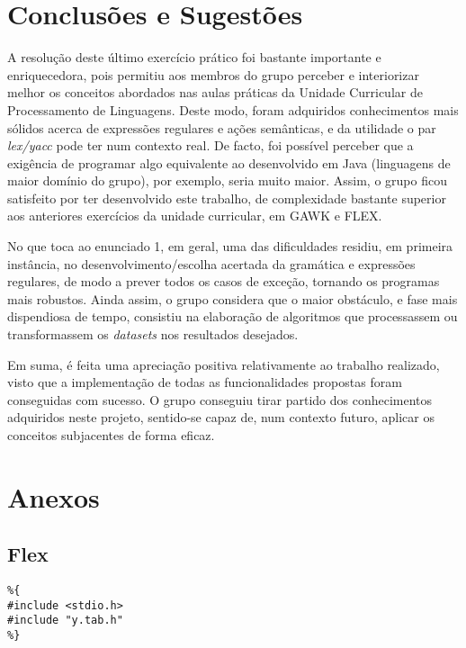 \documentclass[a4paper]{article}
\begin{document}
\section{Conclusões e Sugestões}
\label{sec:5}
\hspace{3.5mm} A resolução deste último exercício prático foi bastante importante e enriquecedora, pois permitiu aos membros do grupo perceber e interiorizar melhor os conceitos abordados nas aulas práticas da Unidade Curricular de Processamento de Linguagens. Deste modo, foram adquiridos conhecimentos mais sólidos acerca de expressões regulares e ações semânticas, e da utilidade o par \textit{lex/yacc} pode ter num contexto real. De facto, foi possível perceber que a exigência de programar algo equivalente ao desenvolvido em Java (linguagens de maior domínio do grupo), por exemplo, seria muito maior. Assim, o grupo ficou satisfeito por ter desenvolvido este trabalho, de complexidade bastante superior aos anteriores exercícios da unidade curricular, em GAWK e FLEX.
\par No que toca ao enunciado 1, em geral, uma das dificuldades residiu, em primeira instância, no desenvolvimento/escolha acertada da gramática e expressões regulares, de modo a prever todos os casos de exceção, tornando os programas mais robustos. Ainda assim, o grupo considera que o maior obstáculo, e fase mais dispendiosa de tempo, consistiu na elaboração de algoritmos que processassem ou transformassem os \emph{datasets} nos resultados desejados.
\par Em suma, é feita uma apreciação positiva relativamente ao trabalho realizado, visto que a implementação de todas as funcionalidades propostas foram conseguidas com sucesso. O grupo conseguiu tirar partido dos conhecimentos adquiridos neste projeto, sentido-se capaz de, num contexto futuro, aplicar os conceitos subjacentes de forma eficaz.


\pagebreak
\section{Anexos}
\label{sec:6}


\subsection{Flex}
\label{sec:6.1}

\begin{lstlisting}
%{
#include <stdio.h>
#include "y.tab.h"
%}
\end{lstlisting}
\end{document}

